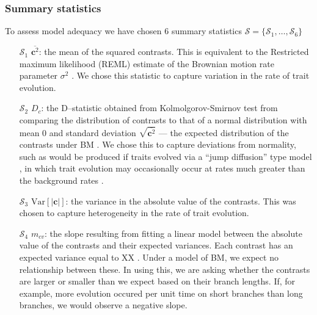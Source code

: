 \documentclass[12pt]{article}
\begin{document}
\subsubsection{Summary statistics}

To assess model adequacy we have chosen 6 summary statistics $\mathcal{S} = \lbrace \mathcal{S}_1, \ldots, \mathcal{S}_6 \rbrace$ 

\begin{enumerate}
\item[$\mathcal{S}_1$] $\overline{\mathbf{c}^2}$: the mean of the squared contrasts. This is equivalent to the Restricted maximum likelihood (REML) estimate of the Brownian motion rate parameter $\sigma^2$ \citep{Garland1992, Rohlf2001}. We chose this statistic to capture variation in the rate of trait evolution.

\item[$\mathcal{S}_2$] $D_c$: the D--statistic obtained from Kolmolgorov-Smirnov test \citep{ks} from comparing the distribution of contrasts to that of a normal distribution with mean 0 and standard deviation $\sqrt{\overline{\mathbf{c}^2}}$ --- the expected distribution of the contrasts under BM \citep{Felsenstein1985, Rohlf2001}. We chose this to capture deviations from normality, such as would be produced if traits evolved via a ``jump diffusion'' type model \citep{Landis2013, Eastmanjump}, in which trait evolution may occasionally occur at rates much greater than the background rates \citep[see][]{PennellPE}.

\item[$\mathcal{S}_3$] $\mathrm{Var}[| \mathbf{c} |]$: the variance in the absolute value of the contrasts. This was chosen to capture heterogeneity in the rate of trait evolution.

\item[$\mathcal{S}_4$] $m_{cv}$: the slope resulting from fitting a linear model between the absolute value of the contrasts and their expected variances. Each contrast has an expected variance equal to XX \citep{Felsenstein1985}. Under a model of BM, we expect no relationship between these. In using this, we are asking whether the contrasts are larger or smaller than we expect based on their branch lengths. If, for example, more evolution occured per unit time on short branches than long branches, we would observe a negative slope. \citep{Garlandetal1992}


\end{enumerate}
\end{document}
